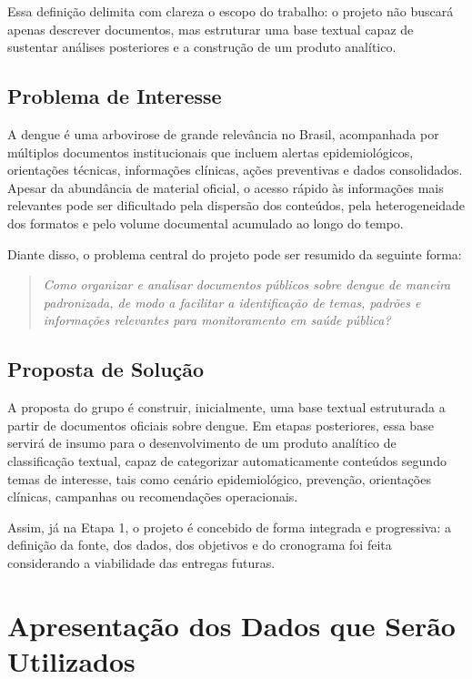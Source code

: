 \documentclass[12pt,a4paper]{article}
\begin{document}
Essa definição delimita com clareza o escopo do trabalho: o projeto não buscará apenas descrever documentos, mas estruturar uma base textual capaz de sustentar análises posteriores e a construção de um produto analítico.

\subsection{Problema de Interesse}

A dengue é uma arbovirose de grande relevância no Brasil, acompanhada por múltiplos documentos institucionais que incluem alertas epidemiológicos, orientações técnicas, informações clínicas, ações preventivas e dados consolidados. Apesar da abundância de material oficial, o acesso rápido às informações mais relevantes pode ser dificultado pela dispersão dos conteúdos, pela heterogeneidade dos formatos e pelo volume documental acumulado ao longo do tempo.

Diante disso, o problema central do projeto pode ser resumido da seguinte forma:

\begin{quote}
\textit{Como organizar e analisar documentos públicos sobre dengue de maneira padronizada, de modo a facilitar a identificação de temas, padrões e informações relevantes para monitoramento em saúde pública?}
\end{quote}

\subsection{Proposta de Solução}

A proposta do grupo é construir, inicialmente, uma base textual estruturada a partir de documentos oficiais sobre dengue. Em etapas posteriores, essa base servirá de insumo para o desenvolvimento de um produto analítico de classificação textual, capaz de categorizar automaticamente conteúdos segundo temas de interesse, tais como cenário epidemiológico, prevenção, orientações clínicas, campanhas ou recomendações operacionais.

Assim, já na Etapa 1, o projeto é concebido de forma integrada e progressiva: a definição da fonte, dos dados, dos objetivos e do cronograma foi feita considerando a viabilidade das entregas futuras.

\clearpage
\section{Apresentação dos Dados que Serão Utilizados}
\end{document}
